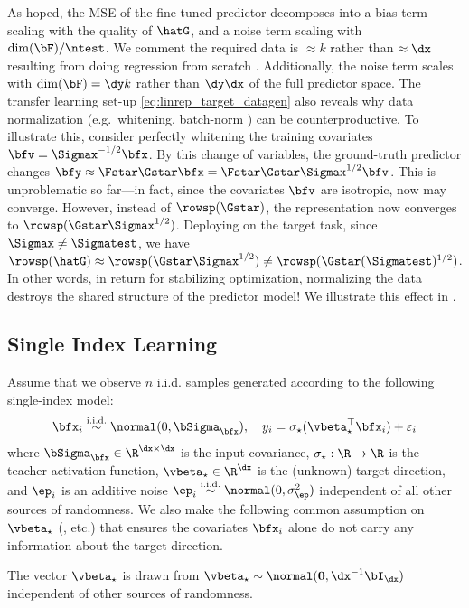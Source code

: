 As hoped, the MSE of the fine-tuned predictor decomposes into a bias term scaling with the quality of $\hatG$, and a noise term scaling with $\dim(\bF)/\ntest$. We comment the required data is $\approx k$ rather than $\approx \dx$ resulting from doing regression from scratch \cite{wainwright2019high}. Additionally, the noise term scales with $\dim(\bF)=\dy k$ rather than $\dy\dx$ of the full predictor space.
The transfer learning set-up \eqref{eq:linrep_target_datagen} also reveals why data normalization (e.g.\ whitening, batch-norm \cite{ioffe2015batch}) can be counterproductive. To illustrate this, consider perfectly whitening the training covariates $\bfv = \Sigmax^{-1/2}\bfx$. By this change of variables, the ground-truth predictor changes $\bfy \approx \Fstar\Gstar \bfx = \Fstar\Gstar\Sigmax^{1/2}\bfv$. This is unproblematic so far---in fact, since the covariates $\bfv$ are isotropic, \SGD now may converge. However, instead of $\rowsp(\Gstar)$, the representation now converges to $\rowsp(\Gstar\Sigmax^{1/2})$. Deploying on the target task, since $\Sigmax \neq \Sigmatest$, we have $\rowsp(\hatG) \approx \rowsp(\Gstar\Sigmax^{1/2}) \neq \rowsp(\Gstar(\Sigmatest)^{1/2})$. In other words, in return for stabilizing optimization, normalizing the data destroys the shared structure of the predictor model! We illustrate this effect in .


\subsection{Single Index Learning}\label{sec:single_index}

Assume that we observe $n$ i.i.d. samples generated according to the following single-index model:
\begin{align}
    \label{eq:data_gen}
    \bfx_i \overset{\mathrm{i.i.d.}}{\sim} \normal(0, \bSigma_\bfx),  \quad y_i = \sigma_\star( \vbeta_\star^\top \bfx_i) + \varepsilon_i
\end{align}
where $\bSigma_\bfx \in \R^{\dx \times \dx}$ is the input covariance, $\sigma_\star:\R\to\R$ is the teacher activation function, $\vbeta_\star \in \R^{\dx}$ is the (unknown) target direction, and $\ep_i$ is an additive noise $\ep_i \overset{\mathrm{i.i.d.}}{\sim} \normal(0, \sigma_\ep^2)$ independent of all other sources of randomness. 
We also make the following common assumption on $\vbeta_\star$ (\citet{dicker2016ridge,dobriban2018high,tripuraneni2021covariate,moniri_atheory2023,moniri2024asymptotics}, etc.) that ensures the covariates $\bfx_i$ alone do not carry any information about the target direction.
\begin{assumption}
    \label{assumption:random-effect}
    The  vector $\vbeta_\star$ is drawn from $\vbeta_\star \sim \normal(\mathbf{0}, \dx^{-1} \bI_{\dx})$ independent of other sources of randomness.
\end{assumption}

